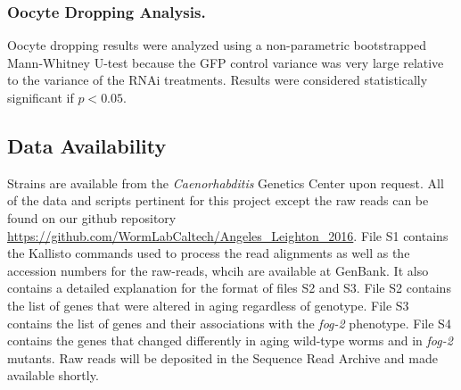 \documentclass[10pt,letterpaper,twocolumn]{article}
\newcommand{\fog}{\emph{fog-2}}
\begin{document}
\subsubsection*{Oocyte Dropping Analysis.}

Oocyte dropping results were analyzed using a non-parametric bootstrapped Mann-Whitney U-test because the GFP control variance was very large relative to the variance of the RNAi treatments. Results were considered statistically significant if $p<0.05$.


\subsection*{Data Availability}
\label{sb:data_availability}
Strains are available from the \emph{Caenorhabditis} Genetics Center upon request. All of the data and scripts pertinent for this project except the raw reads can be found on our github repository \url{https://github.com/WormLabCaltech/Angeles_Leighton_2016}. File S1 contains the Kallisto commands used to process the read alignments as well as the accession numbers for the raw-reads, whcih are available at GenBank. It also contains a detailed explanation for the format of files S2 and S3. File S2 contains the list of genes that were altered in aging regardless of genotype. File S3 contains the list of genes and their associations with the \fog{} phenotype. File S4 contains the genes that changed differently in aging wild-type worms and in \fog{} mutants. Raw reads will be deposited in the Sequence Read Archive and made available shortly.
\end{document}

